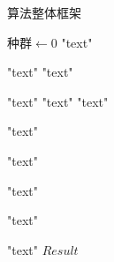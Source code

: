 \documentclass[11pt]{article}
\begin{document}
\begin{CJK*}{UTF8}{gkai}
    \begin{algorithm}
        \caption{算法整体框架}
        \begin{algorithmic}[1] %
        \State $种群 \gets 0$
                  "text"   \EndIf
                \State
                
                   "text"   
                \Else   "text"    
                \EndIf\State                
                
                     "text"   
                   "text"       
                \Else   "text"  
                \EndIf\State
                
                   "text"   \EndFor\State
                
                  "text"  \EndFor\State
                
                  "text"  \EndWhile\State
                
                \Repeat "text"  \State
                
                \Loop "text"  \EndLoop\State
                \Return $Result$
            \EndFunction
 
        \end{algorithmic}
    \end{algorithm}
\end{CJK*}
\end{document}
